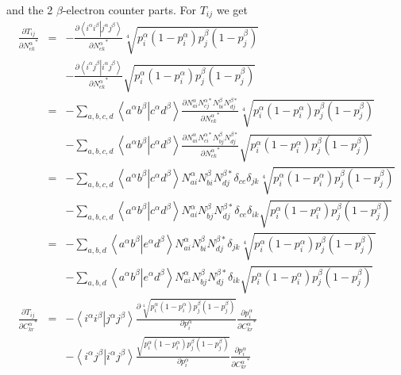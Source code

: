 \documentclass[pra]{revtex4-1}
\newcommand{\eria}[4]{\left\langle #1^\alpha #2^\beta \right.\left| #3^\alpha #4^\beta \right\rangle}
\begin{document}
and the 2 $\beta$-electron counter parts.
For $T_{ij}$ we get
\begin{eqnarray}
   \frac{\partial T_{ij} }{\partial \left.N_{ek}^\alpha\right.^*}
   &=&  -\frac{\partial\eria{i}{i}{j}{j}}{\partial \left.N_{ek}^\alpha\right.^*}
         \sqrt[4]{p_i^\alpha(1-p_i^\alpha) p_j^\beta(1-p_j^\beta)} \nonumber \\
   &&   -\frac{\partial\eria{i}{j}{i}{j}}{\partial \left.N_{ek}^\alpha\right.^*}
         \sqrt{p_i^\alpha(1-p_i^\alpha) p_j^\beta(1-p_j^\beta)} \\
   &=&  -\sum_{a,b,c,d}\eria{a}{b}{c}{d}
         \frac{\partial N_{ai}^\alpha N_{cj}^{\alpha*}N_{bi}^\beta N_{dj}^{\beta*}}
              {\partial \left.N_{ek}^\alpha\right.^*}
         \sqrt[4]{p_i^\alpha(1-p_i^\alpha) p_j^\beta(1-p_j^\beta)} \nonumber \\
   &&   -\sum_{a,b,c,d}\eria{a}{b}{c}{d}
         \frac{\partial N_{ai}^\alpha N_{ci}^{\alpha*}N_{bj}^\beta N_{dj}^{\beta*}}
              {\partial \left.N_{ek}^\alpha\right.^*}
         \sqrt{p_i^\alpha(1-p_i^\alpha) p_j^\beta(1-p_j^\beta)} \\
   &=&  -\sum_{a,b,c,d}\eria{a}{b}{c}{d}
         N_{ai}^\alpha N_{bi}^\beta N_{dj}^{\beta*}\delta_{ce}\delta_{jk}
         \sqrt[4]{p_i^\alpha(1-p_i^\alpha) p_j^\beta(1-p_j^\beta)} \nonumber \\
   &&   -\sum_{a,b,c,d}\eria{a}{b}{c}{d}
         N_{ai}^\alpha N_{bj}^\beta N_{dj}^{\beta*}\delta_{ce}\delta_{ik}
         \sqrt{p_i^\alpha(1-p_i^\alpha) p_j^\beta(1-p_j^\beta)} \\
   &=&  -\sum_{a,b,d}\eria{a}{b}{e}{d}
         N_{ai}^\alpha N_{bi}^\beta N_{dj}^{\beta*}\delta_{jk}
         \sqrt[4]{p_i^\alpha(1-p_i^\alpha) p_j^\beta(1-p_j^\beta)} \nonumber \\
   &&   -\sum_{a,b,d}\eria{a}{b}{e}{d}
         N_{ai}^\alpha N_{bj}^\beta N_{dj}^{\beta*}\delta_{ik}
         \sqrt{p_i^\alpha(1-p_i^\alpha) p_j^\beta(1-p_j^\beta)} \\
   \frac{\partial T_{ij}}{\partial \left.C_{kr}^\alpha\right.^*}
   &=&  -\eria{i}{i}{j}{j} 
         \frac{\partial\sqrt[4]{p_i^\alpha(1-p_i^\alpha) p_j^\beta(1-p_j^\beta)}}
              {\partial p_i^\alpha}
         \frac{\partial p_i^\alpha}
              {\partial \left.C_{kr}^\alpha\right.^*}
         \nonumber \\
   &&   -\eria{i}{j}{i}{j}
         \frac{\sqrt{p_i^\alpha(1-p_i^\alpha) p_j^\beta(1-p_j^\beta)}}
              {\partial p_i^\alpha}
         \frac{\partial p_i^\alpha}
              {\partial \left.C_{kr}^\alpha\right.^*} \\

\end{eqnarray}
\end{document}
